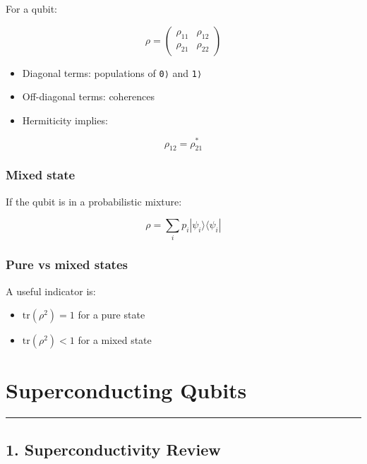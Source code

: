 \documentclass[
]{article}
\providecommand{\tightlist}{%
  \setlength{\itemsep}{0pt}\setlength{\parskip}{0pt}}
\begin{document}
For a qubit:

\[
\rho = \begin{pmatrix}
\rho_{11} & \rho_{12} \\
\rho_{21} & \rho_{22}
\end{pmatrix}
\]

\begin{itemize}
\tightlist
\item
  Diagonal terms: populations of \texttt{\textbar{}0⟩} and
  \texttt{\textbar{}1⟩}
\item
  Off-diagonal terms: coherences
\item
  Hermiticity implies:
\end{itemize}

\[
\rho_{12} = \rho_{21}^{*}
\]

\subsubsection{Mixed state}\label{mixed-state}

If the qubit is in a probabilistic mixture:

$$\rho = \sum_i p_i |\psi_i\rangle\langle\psi_i|$$

\subsubsection{Pure vs mixed states}\label{pure-vs-mixed-states}

A useful indicator is:

\begin{itemize}
  \item $\text{tr}(\rho^2) = 1$ for a pure state
  \item $\text{tr}(\rho^2) < 1$ for a mixed state
\end{itemize}

\section{Superconducting Qubits}\label{superconducting-qubits}

\begin{center}\rule{0.5\linewidth}{0.5pt}\end{center}

\subsection{1. Superconductivity Review}\label{superconductivity-review}
\end{document}
